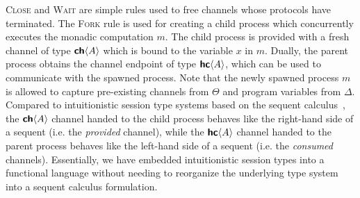 \noindent
\textsc{Close} and \textsc{Wait} are simple rules used to free channels whose
protocols have terminated. The \textsc{Fork} rule is used for creating a child
process which concurrently executes the monadic computation $m$. The child
process is provided with a fresh channel of type ${\textbf{\textsf{ch}}\langle{A}\rangle}$ which is bound to the
variable $x$ in $m$. Dually, the parent process obtains the channel endpoint of
type ${\textbf{\textsf{hc}}\langle{A}\rangle}$, which can be used to communicate with the spawned process. Note
that the newly spawned process $m$ is allowed to capture pre-existing channels
from $\Theta$ and program variables from $\Delta$. Compared to intuitionistic
session type systems based on the sequent
calculus~\cite{caires10,pfenning11,das20}, the ${\textbf{\textsf{ch}}\langle{A}\rangle}$ channel handed to the
child process behaves like the right-hand side of a sequent (i.e. the
\emph{provided} channel), while the ${\textbf{\textsf{hc}}\langle{A}\rangle}$ channel handed to the parent
process behaves like the left-hand side of a sequent (i.e. the \emph{consumed}
channels). Essentially, we have embedded intuitionistic session types into a
functional language without needing to reorganize the underlying type system
into a sequent calculus formulation.
